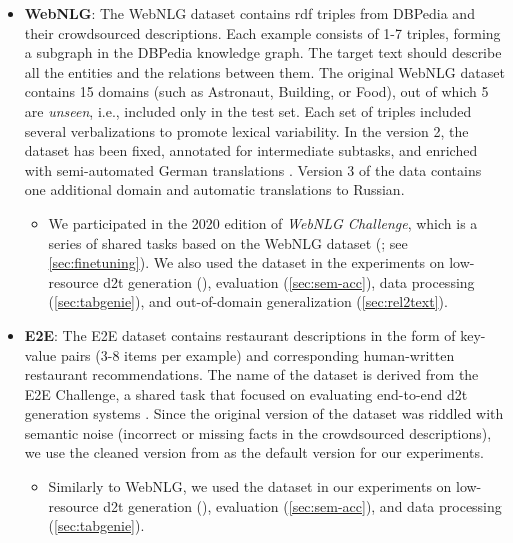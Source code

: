 {\begin{itemize}
    \item \textbf{WebNLG}: The WebNLG dataset \cite{gardentCreatingTrainingCorpora2017,gardentWebNLGChallengeGenerating2017} contains \ac{rdf} triples from DBPedia \cite{auer2007dbpedia} and their crowdsourced descriptions. Each example consists of 1-7 triples, forming a subgraph in the DBPedia knowledge graph. The target text should describe all the entities and the relations between them. The original WebNLG dataset \cite{gardentCreatingTrainingCorpora2017} contains 15 domains (such as Astronaut, Building, or Food), out of which 5 are \emph{unseen}, i.e., included only in the test set. Each set of triples included several verbalizations to promote lexical variability. In the version 2, the dataset has been fixed, annotated for intermediate subtasks, and enriched with semi-automated German translations \cite{shimorinaHandlingRareItems2018,castroferreiraEnrichingWebNLGCorpus2018}. Version 3 of the data \cite{ferreira20202020} contains one additional domain and automatic translations to Russian.
          \begin{itemize}
              \item
                    We participated in the 2020 edition of \emph{WebNLG Challenge}, which is a series of shared tasks based on the WebNLG dataset (\citealp{gardentWebNLGChallengeGenerating2017,shimorinaWebNLGChallengeHuman2019,ferreira20202020,cripwell2023WebNLGShared2023}; see \autoref{sec:finetuning}). We also used the dataset in the experiments on low-resource \ac{d2t} generation (), evaluation (\autoref{sec:sem-acc}), data processing (\autoref{sec:tabgenie}), and out-of-domain generalization (\autoref{sec:rel2text}).
          \end{itemize}

    \item \textbf{E2E}: The E2E dataset \cite{dusekEvaluatingStateoftheartEndtoEnd2020,dusekSemanticNoiseMatters2019} contains restaurant descriptions in the form of key-value pairs (3-8 items per example) and corresponding human-written restaurant recommendations. The name of the dataset is derived from the E2E Challenge, a shared task that focused on evaluating end-to-end \ac{d2t} generation systems \cite{dusekEvaluatingStateoftheartEndtoEnd2020}. Since the original version of the dataset was riddled with semantic noise (incorrect or missing facts in the crowdsourced descriptions), we use the cleaned version from \citet{dusekSemanticNoiseMatters2019} as the default version for our experiments.
          \begin{itemize}
              \item
                    Similarly to WebNLG, we used the dataset in our experiments on low-resource \ac{d2t} generation (), evaluation (\autoref{sec:sem-acc}), and data processing (\autoref{sec:tabgenie}).
          \end{itemize}


\end{itemize}}
